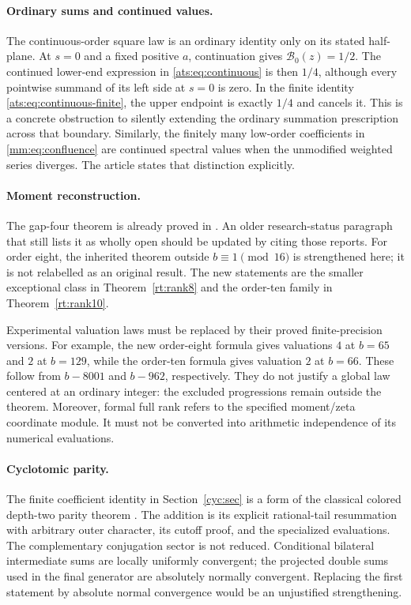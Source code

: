 \paragraph{Ordinary sums and continued values.}
The continuous-order square law is an ordinary identity only on its
stated half-plane. At $s=0$ and a fixed positive $a$, continuation gives
$\mathcal B_0(z)=1/2$. The continued lower-end expression in
\eqref{ats:eq:continuous} is then $1/4$, although every pointwise
summand of its left side at $s=0$ is zero. In the finite identity
\eqref{ats:eq:continuous-finite}, the upper endpoint is exactly $1/4$
and cancels it. This is a concrete obstruction to silently extending
the ordinary summation prescription across that boundary. Similarly,
the finitely many low-order coefficients in
\eqref{mm:eq:confluence} are continued spectral values when the
unmodified weighted series diverges. The article states that distinction
explicitly.

\paragraph{Moment reconstruction.}
The gap-four theorem is already proved in \cite{HTGC,HTST}. An older
research-status paragraph that still lists it as wholly open should
be updated by citing those reports. For order eight, the inherited
theorem outside $b\equiv1\pmod{16}$ is strengthened here; it is not
relabelled as an original result. The new statements are the smaller
exceptional class in Theorem~\ref{rt:rank8} and the order-ten family in
Theorem~\ref{rt:rank10}.

Experimental valuation laws must be replaced by their proved
finite-precision versions. For example, the new order-eight formula
gives valuations $4$ at $b=65$ and $2$ at $b=129$, while the
order-ten formula gives valuation $2$ at $b=66$.
These follow from $b-8001$ and $b-962$, respectively. They do not
justify a global law centered at an ordinary integer: the excluded
progressions remain outside the theorem. Moreover, formal full rank
refers to the specified moment/zeta coordinate module. It must not
be converted into arithmetic independence of its numerical evaluations.

\paragraph{Cyclotomic parity.}
The finite coefficient identity in Section~\ref{cyc:sec} is a form
of the classical colored depth-two parity theorem \cite{PanzerParity}.
The addition is its explicit rational-tail resummation with arbitrary
outer character, its cutoff proof, and the specialized evaluations.
The complementary conjugation sector is not reduced. Conditional
bilateral intermediate sums are locally uniformly convergent; the
projected double sums used in the final generator are absolutely
normally convergent. Replacing the first statement by absolute normal
convergence would be an unjustified strengthening.

